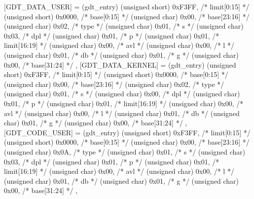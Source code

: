     [GDT_DATA_USER] = (gdt_entry) {
        (unsigned short)    0xF3FF,         /* limit[0:15]  */
        (unsigned short)    0x0000,         /* base[0:15]   */
        (unsigned char)     0x00,           /* base[23:16]  */
        (unsigned char)     0x02,           /* type         */
        (unsigned char)     0x01,           /* s            */
        (unsigned char)     0x03,           /* dpl          */
        (unsigned char)     0x01,           /* p            */
        (unsigned char)     0x01,           /* limit[16:19] */
        (unsigned char)     0x00,           /* avl          */
        (unsigned char)     0x00,           /* l            */
        (unsigned char)     0x01,           /* db           */
        (unsigned char)     0x01,           /* g            */
        (unsigned char)     0x00,           /* base[31:24]  */
    },
    [GDT_DATA_KERNEL] = (gdt_entry) {
        (unsigned short)    0xF3FF,         /* limit[0:15]  */
        (unsigned short)    0x0000,         /* base[0:15]   */
        (unsigned char)     0x00,           /* base[23:16]  */
        (unsigned char)     0x02,           /* type         */
        (unsigned char)     0x01,           /* s            */
        (unsigned char)     0x00,           /* dpl          */
        (unsigned char)     0x01,           /* p            */
        (unsigned char)     0x01,           /* limit[16:19] */
        (unsigned char)     0x00,           /* avl          */
        (unsigned char)     0x00,           /* l            */
        (unsigned char)     0x01,           /* db           */
        (unsigned char)     0x01,           /* g            */
        (unsigned char)     0x00,           /* base[31:24]  */
    },
    [GDT_CODE_USER] = (gdt_entry) {
        (unsigned short)    0xF3FF,         /* limit[0:15]  */
        (unsigned short)    0x0000,         /* base[0:15]   */
        (unsigned char)     0x00,           /* base[23:16]  */
        (unsigned char)     0x0A,           /* type         */
        (unsigned char)     0x01,           /* s            */
        (unsigned char)     0x03,           /* dpl          */
        (unsigned char)     0x01,           /* p            */
        (unsigned char)     0x01,           /* limit[16:19] */
        (unsigned char)     0x00,           /* avl          */
        (unsigned char)     0x00,           /* l            */
        (unsigned char)     0x01,           /* db           */
        (unsigned char)     0x01,           /* g            */
        (unsigned char)     0x00,           /* base[31:24]  */
    },
